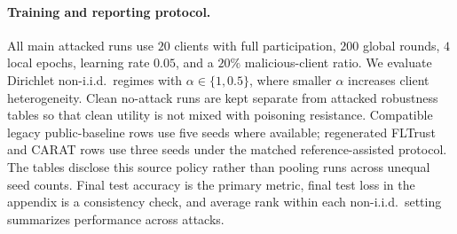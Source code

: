 \documentclass{article}
\begin{document}
\paragraph{Training and reporting protocol.}
All main attacked runs use $20$ clients with full participation, $200$ global rounds, $4$ local epochs, learning rate $0.05$, and a $20\%$ malicious-client ratio. We evaluate Dirichlet non-i.i.d.\ regimes with $\alpha\in\{1,0.5\}$, where smaller $\alpha$ increases client heterogeneity. Clean no-attack runs are kept separate from attacked robustness tables so that clean utility is not mixed with poisoning resistance. Compatible legacy public-baseline rows use five seeds where available; regenerated FLTrust and CARAT rows use three seeds under the matched reference-assisted protocol. The tables disclose this source policy rather than pooling runs across unequal seed counts. Final test accuracy is the primary metric, final test loss in the appendix is a consistency check, and average rank within each non-i.i.d.\ setting summarizes performance across attacks.
\end{document}
